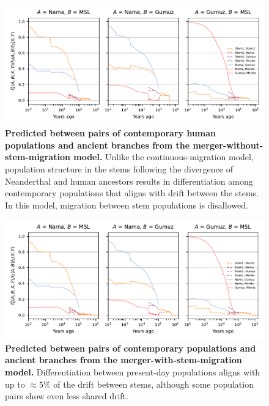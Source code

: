 \documentclass[]{article}
\begin{document}
\begin{figure}[ht]
    \centering
    \includegraphics{figures/supp-f4s-merger-without-stem-migration.pdf}
    \caption{
        \textbf{Predicted  between pairs of contemporary human populations
        and ancient branches from the merger-without-stem-migration model.}
        Unlike the continuous-migration model, population structure in the stems
        following the divergence of Neanderthal and human ancestors results
        in differentiation among contemporary populations that aligns with drift
        between the stems. In this model, migration between stem populations
        is disallowed.
    }
    \label{fig:supp-f4s-merger-without-stem-migration}
\end{figure}

\begin{figure}[ht]
    \centering
    \includegraphics{figures/supp-f4s-merger-with-stem-migration.pdf}
    \caption{
        \textbf{Predicted  between pairs of contemporary populations
        and ancient branches from the merger-with-stem-migration model.}
        Differentiation between present-day populations aligns with
        up to $\approx 5\%$ of the drift between stems, although some
        population pairs show even less shared drift.
    }
    \label{fig:supp-f4s-merger-with-stem-migration}
\end{figure}
\end{document}
